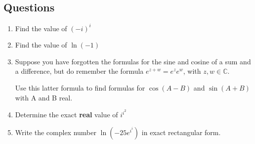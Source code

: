 \documentclass[../main.tex]{subfiles}
\begin{document}
\subsection*{Questions}
\label{eulersformula}
\begin{enumerate}
    \item 
    Find the value of \((-i)^i\)

    \item 
    Find the value of \(\ln{(-1)}\)

    \item 
    Suppose you have forgotten the formulas for the sine and cosine of a sum and a difference, but do remember the formula \(e^{z+w}=e^z e^w\), with \(z, w \in \mathbb{C} \).

    Use this latter formula to find formulas for \(\cos{(A-B)}\) and \(\sin{(A+B)}\) with A and B real.

    \item 
    Determine the exact \textbf{real} value of \(i^{i^{2}}\)

    \item 
    Write the complex number \(\ln{(-25e^{i^{i}})}\) in exact rectangular form.

    
\end{enumerate}
\end{document}
